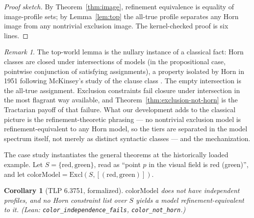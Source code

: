 \documentclass[10pt, letterpaper]{article}
\newtheorem{corollary}[theorem]{Corollary}
\theoremstyle{remark}
\newtheorem{remark}[theorem]{Remark}
\newcommand{\lean}[1]{\texttt{#1}}
\begin{document}
\begin{proof}[Proof sketch]
By Theorem~\ref{thm:image}, refinement equivalence is equality of
image-profile sets; by Lemma~\ref{lem:top} the all-true profile separates
any Horn image from any nontrivial exclusion image. The kernel-checked proof
is six lines. \end{proof}

\begin{remark}\label{rem:horn1951}
The top-world lemma is the nullary instance of a classical fact: Horn classes
are closed under intersections of models (in the propositional case,
pointwise conjunction of satisfying assignments), a property isolated by Horn
in 1951 \cite{horn1951} following McKinsey's study of the clause class
\cite{mckinsey1943}. The empty intersection is the all-true assignment.
Exclusion constraints fail closure under intersection in the most flagrant
way available, and Theorem~\ref{thm:exclusion-not-horn} is the Tractarian
payoff of that failure. What our development adds to the classical picture is
the refinement-theoretic phrasing --- no nontrivial exclusion model is
refinement-equivalent to any Horn model, so the tiers are separated in the
model spectrum itself, not merely as distinct syntactic classes --- and the
mechanization.
\end{remark}

The case study instantiates the general theorems at the historically loaded
example. Let $S = \{\mathrm{red}, \mathrm{green}\}$, read as ``point $p$ in
the visual field is red (green)'', and let
$\mathrm{colorModel} = \mathrm{Excl}(S, [(\mathrm{red}, \mathrm{green})])$.

\begin{corollary}[TLP 6.3751, formalized]\label{cor:color}
$\mathrm{colorModel}$ does not have independent profiles, and no Horn
constraint list over $S$ yields a model refinement-equivalent to it. (Lean:
\lean{color\_independence\_fails}, \lean{color\_not\_horn}.)
\end{corollary}
\end{document}
